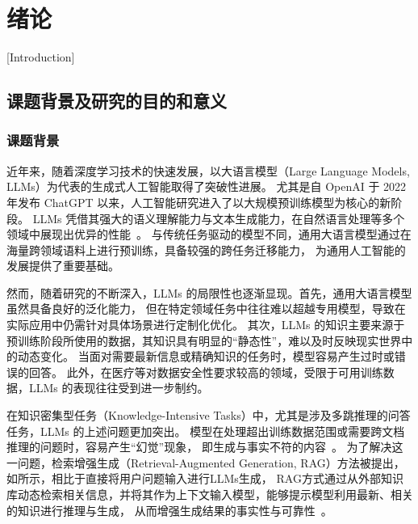 
\chapter{绪\hspace{1em}论}[Introduction]

\section{课题背景及研究的目的和意义}

\subsection{课题背景}

近年来，随着深度学习技术的快速发展，以大语言模型（Large Language Models, LLMs）为代表的生成式人工智能取得了突破性进展。
尤其是自 OpenAI 于 2022 年发布 ChatGPT 以来，人工智能研究进入了以大规模预训练模型为核心的新阶段\cite{PZKX202309008}。
LLMs 凭借其强大的语义理解能力与文本生成能力，在自然语言处理等多个领域中展现出优异的性能~\cite{llm,ouyang2022training,llama}。
与传统任务驱动的模型不同，通用大语言模型通过在海量跨领域语料上进行预训练，具备较强的跨任务迁移能力，
为通用人工智能的发展提供了重要基础。

然而，随着研究的不断深入，LLMs 的局限性也逐渐显现。首先，通用大语言模型虽然具备良好的泛化能力，
但在特定领域任务中往往难以超越专用模型，导致在实际应用中仍需针对具体场景进行定制化优化。
其次，LLMs 的知识主要来源于预训练阶段所使用的数据，其知识具有明显的“静态性”，难以及时反映现实世界中的动态变化。
当面对需要最新信息或精确知识的任务时，模型容易产生过时或错误的回答。
此外，在医疗等对数据安全性要求较高的领域，受限于可用训练数据，LLMs 的表现往往受到进一步制约\cite{KXTS202507002}。

在知识密集型任务（Knowledge-Intensive Tasks）中，尤其是涉及多跳推理的问答任务，LLMs 的上述问题更加突出。
模型在处理超出训练数据范围或需要跨文档推理的问题时，容易产生“幻觉”现象，
即生成与事实不符的内容~\cite{knowledge-intensive, hallucinations, JSJA202401009}。
为了解决这一问题，检索增强生成（Retrieval-Augmented Generation, RAG）方法被提出，
如所示，相比于直接将用户问题输入进行LLMs生成，
RAG方式通过从外部知识库动态检索相关信息，并将其作为上下文输入模型，能够提示模型利用最新、相关的知识进行推理与生成，
从而增强生成结果的事实性与可靠性~\cite{lewis2020retrieval,rag,izacard2022few}。

